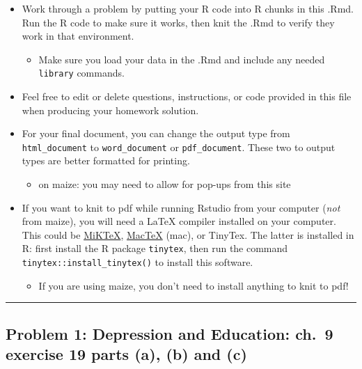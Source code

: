 \documentclass[
]{article}
\providecommand{\tightlist}{%
  \setlength{\itemsep}{0pt}\setlength{\parskip}{0pt}}
\begin{document}
\begin{itemize}
\tightlist
\item
  Work through a problem by putting your R code into R chunks in this
  .Rmd. Run the R code to make sure it works, then knit the .Rmd to
  verify they work in that environment.

  \begin{itemize}
  \tightlist
  \item
    Make sure you load your data in the .Rmd and include any needed
    \texttt{library} commands.
  \end{itemize}
\item
  Feel free to edit or delete questions, instructions, or code provided
  in this file when producing your homework solution.
\item
  For your final document, you can change the output type from
  \texttt{html\_document} to \texttt{word\_document} or
  \texttt{pdf\_document}. These two to output types are better formatted
  for printing.

  \begin{itemize}
  \tightlist
  \item
    on maize: you may need to allow for pop-ups from this site
  \end{itemize}
\item
  If you want to knit to pdf while running Rstudio from your computer
  (\emph{not} from maize), you will need a LaTeX compiler installed on
  your computer. This could be \href{https://miktex.org/}{MiKTeX},
  \href{http://www.tug.org/mactex/}{MacTeX} (mac), or TinyTex. The
  latter is installed in R: first install the R package
  \texttt{tinytex}, then run the command
  \texttt{tinytex::install\_tinytex()} to install this software.

  \begin{itemize}
  \tightlist
  \item
    If you are using maize, you don't need to install anything to knit
    to pdf!
  \end{itemize}
\end{itemize}

\begin{center}\rule{0.5\linewidth}{0.5pt}\end{center}

\hypertarget{problem-1-depression-and-education-ch.-9-exercise-19-parts-a-b-and-c}{%
\subsection{Problem 1: Depression and Education: ch.~9 exercise 19 parts
(a), (b) and
(c)}\label{problem-1-depression-and-education-ch.-9-exercise-19-parts-a-b-and-c}}
\end{document}
